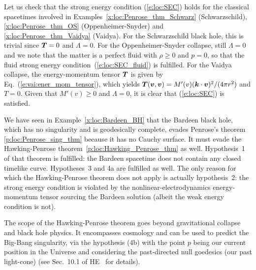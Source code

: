 \begin{example}
Let us check that the strong energy condition (\ref{e:loc:SEC}) holds for the classical
spacetimes involved in Examples~\ref{x:loc:Penrose_thm_Schwarz} (Schwarzschild),
\ref{x:loc:Penrose_thm_OS} (Oppenheimer-Snyder) and \ref{x:loc:Penrose_thm_Vaidya} (Vaidya).
For the Schwarzschild black hole, this is trivial since $\bm{T} = 0$ and $\Lambda=0$.
For the Oppenheimer-Snyder collapse, still $\Lambda=0$ and we note that the matter is a
perfect fluid with $\rho \geq 0$ and $p=0$,
so that the fluid strong energy condition~(\ref{e:loc:SEC_fluid}) is fulfilled.
For the Vaidya collapse, the energy-momentum tensor $\bm{T}$ is given by Eq.~(\ref{e:vai:ener_mom_tensor}),
which yields $\bm{T}(\bm{v},\bm{v}) = M'(v) (\bm{k}\cdot\bm{v})^2 / (4\pi r^2)$ and $T = 0$. Given that
$M'(v) \geq 0$ and $\Lambda=0$, it is clear that (\ref{e:loc:SEC}) is satisfied.
\end{example}

\begin{example}
We have seen in Example~\ref{x:loc:Bardeen_BH} that the Bardeen
black hole, which has no singularity and is geodesically complete, evades
Penrose's theorem \ref{p:loc:Penrose_sing_thm} because it has no Cauchy surface. It must evade the
Hawking-Penrose theorem~\ref{p:loc:Hawking_Penrose_thm} as well.
Hypothesis~1 of
that theorem
is fulfilled: the Bardeen spacetime does not contain any closed timelike curve.
Hypotheses~3 and 4a are fulfilled as well. The only reason for which the Hawking-Penrose theorem
does not apply is actually hypothesis~2: the strong energy condition is violated
by the nonlinear-electrodynamics energy-momentum tensor sourcing the Bardeen solution
(albeit the weak energy condition is not).
\end{example}

\begin{remark}
The scope of the Hawking-Penrose theorem goes beyond gravitational collapse and
black hole physics. It encompasses cosmology and can be used to predict the Big-Bang singularity,
via the hypothesis (4b) with the point $p$ being our current position in the Universe and
considering the past-directed null goedesics (our past light-cone) (see Sec.~10.1 of HE~\cite{HawkiE73}
for details).
\end{remark}

